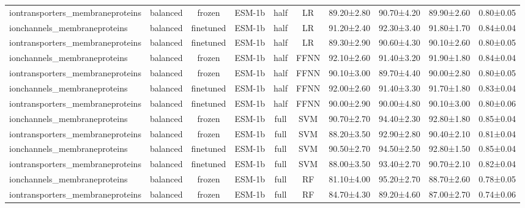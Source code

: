 \begin{tabular}{lcccccc}
iontransporters\_membraneproteins &   balanced &         frozen &       ESM-1b &      half &         LR &  89.20±2.80 &  90.70±4.20 &  89.90±2.60 & 0.80±0.05 \\
    ionchannels\_membraneproteins &   balanced &      finetuned &       ESM-1b &      half &         LR &  91.20±2.40 &  92.30±3.40 &  91.80±1.70 & 0.84±0.04 \\
iontransporters\_membraneproteins &   balanced &      finetuned &       ESM-1b &      half &         LR &  89.30±2.90 &  90.60±4.30 &  90.10±2.60 & 0.80±0.05 \\
    ionchannels\_membraneproteins &   balanced &         frozen &       ESM-1b &      half &       FFNN &  92.10±2.60 &  91.40±3.20 &  91.90±1.80 & 0.84±0.04 \\
iontransporters\_membraneproteins &   balanced &         frozen &       ESM-1b &      half &       FFNN &  90.10±3.00 &  89.70±4.40 &  90.00±2.80 & 0.80±0.05 \\
    ionchannels\_membraneproteins &   balanced &      finetuned &       ESM-1b &      half &       FFNN &  92.00±2.60 &  91.40±3.30 &  91.70±1.80 & 0.83±0.04 \\
iontransporters\_membraneproteins &   balanced &      finetuned &       ESM-1b &      half &       FFNN &  90.00±2.90 &  90.00±4.80 &  90.10±3.00 & 0.80±0.06 \\
    ionchannels\_membraneproteins &   balanced &         frozen &       ESM-1b &      full &        SVM &  90.70±2.70 &  94.40±2.30 &  92.80±1.80 & 0.85±0.04 \\
iontransporters\_membraneproteins &   balanced &         frozen &       ESM-1b &      full &        SVM &  88.20±3.50 &  92.90±2.80 &  90.40±2.10 & 0.81±0.04 \\
    ionchannels\_membraneproteins &   balanced &      finetuned &       ESM-1b &      full &        SVM &  90.50±2.70 &  94.50±2.50 &  92.80±1.50 & 0.85±0.04 \\
iontransporters\_membraneproteins &   balanced &      finetuned &       ESM-1b &      full &        SVM &  88.00±3.50 &  93.40±2.70 &  90.70±2.10 & 0.82±0.04 \\
    ionchannels\_membraneproteins &   balanced &         frozen &       ESM-1b &      full &         RF &  81.10±4.00 &  95.20±2.70 &  88.70±2.60 & 0.78±0.05 \\
iontransporters\_membraneproteins &   balanced &         frozen &       ESM-1b &      full &         RF &  84.70±4.30 &  89.20±4.60 &  87.00±2.70 & 0.74±0.06 \\

\end{tabular}
